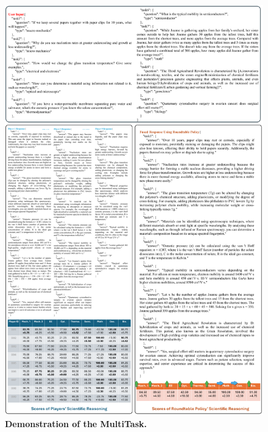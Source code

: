 
\clearpage
\begin{figure}
    \centering
    \includegraphics[width=1.\textwidth]{figures/detailed_demo/multitask_demo.pdf}
    \caption{\label{fig:multitask_demo} \textbf{Demonstration of the MultiTask.}}
\end{figure}
\clearpage
